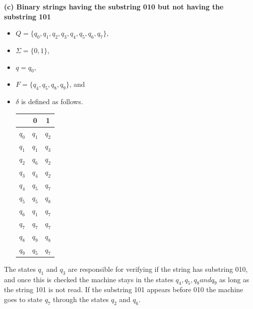 \documentclass[11pt]{article}
\renewcommand{\part}[1] {{\vspace{0.15in}\noindent\textbf (#1)} \vspace{0.10in}}
\begin{document}
\textbf{\part{c} Binary strings having the substring 010 but not having the substring 101}
\begin{itemize}
	\item $Q = \{q_0, q_1, q_2, q_3, q_4, q_5, q_6, q_7\}$,	
	\item $\Sigma = \{0,1\}$,
	\item $q = q_0$,
	\item $F = \{q_4, q_5, q_8, q_9\}$, and
        \item $\delta$ is defined as follows.

\begin{tabular}{|c||c|c|}  \hline
      & 0 & 1 \\ \hline 
      $q_0$ & $q_1$ & $q_2$ \\ \hline 
      $q_1$ & $q_1$ & $q_3$ \\ \hline
      $q_2$ & $q_6$ & $q_2$ \\ \hline
      $q_3$ & $q_4$ & $q_2$ \\ \hline 
      $q_4$ & $q_5$ & $q_7$ \\ \hline 
      $q_5$ & $q_5$ & $q_8$ \\ \hline 
      $q_6$ & $q_1$ & $q_7$ \\ \hline 
      $q_7$ & $q_7$ & $q_7$ \\ \hline 
      $q_8$ & $q_9$ & $q_8$ \\ \hline 
      $q_9$ & $q_5$ & $q_7$ \\ \hline 
\end{tabular}
\end{itemize}
The states $q_1$ and $q_3$ are responsible for verifying if the string has substring 010, and once this is checked the machine stays in the states $q_4, q_5, q_8 and q_9$ as long as the string 101 is not read. If the substring 101 appears before 010 the machine goes to state $q_7$ through the states $q_2$ and $q_6$.
\end{document}

